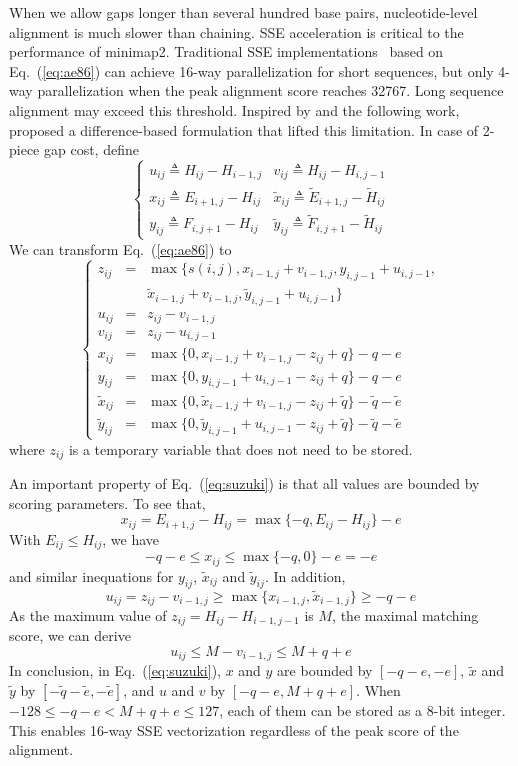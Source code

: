 \documentclass{bioinfo}
\begin{document}
\begin{methods}
When we allow gaps longer than several hundred base pairs, nucleotide-level
alignment is much slower than chaining. SSE acceleration is critical to the
performance of minimap2. Traditional SSE implementations~\citep{Farrar:2007hs}
based on Eq.~(\ref{eq:ae86}) can achieve 16-way parallelization for short
sequences, but only 4-way parallelization when the peak alignment score reaches
32767. Long sequence alignment may exceed this threshold. Inspired by
\citet{Wu:1996aa} and the following work, \citet{Suzuki130633} proposed a
difference-based formulation that lifted this limitation.
In case of 2-piece gap cost, define
\[
\left\{\begin{array}{ll}
u_{ij}\triangleq H_{ij}-H_{i-1,j} & v_{ij}\triangleq H_{ij}-H_{i,j-1} \\
x_{ij}\triangleq E_{i+1,j}-H_{ij} & \tilde{x}_{ij}\triangleq \tilde{E}_{i+1,j}-\tilde{H}_{ij} \\
y_{ij}\triangleq F_{i,j+1}-H_{ij} & \tilde{y}_{ij}\triangleq \tilde{F}_{i,j+1}-\tilde{H}_{ij}
\end{array}\right.
\]
We can transform Eq.~(\ref{eq:ae86}) to
\begin{equation}\label{eq:suzuki}
\left\{\begin{array}{lll}
z_{ij}&=&\max\{s(i,j),x_{i-1,j}+v_{i-1,j},y_{i,j-1}+u_{i,j-1},\\
&&\tilde{x}_{i-1,j}+v_{i-1,j},\tilde{y}_{i,j-1}+u_{i,j-1}\}\\
u_{ij}&=&z_{ij}-v_{i-1,j}\\
v_{ij}&=&z_{ij}-u_{i,j-1}\\
x_{ij}&=&\max\{0,x_{i-1,j}+v_{i-1,j}-z_{ij}+q\}-q-e\\
y_{ij}&=&\max\{0,y_{i,j-1}+u_{i,j-1}-z_{ij}+q\}-q-e\\
\tilde{x}_{ij}&=&\max\{0,\tilde{x}_{i-1,j}+v_{i-1,j}-z_{ij}+\tilde{q}\}-\tilde{q}-\tilde{e}\\
\tilde{y}_{ij}&=&\max\{0,\tilde{y}_{i,j-1}+u_{i,j-1}-z_{ij}+\tilde{q}\}-\tilde{q}-\tilde{e}
\end{array}\right.
\end{equation}
where $z_{ij}$ is a temporary variable that does not need to be stored.

An important property of Eq.~(\ref{eq:suzuki}) is that all values are bounded
by scoring parameters. To see that,
\[
x_{ij}=E_{i+1,j}-H_{ij}=\max\{-q,E_{ij}-H_{ij}\}-e
\]
With $E_{ij}\le H_{ij}$, we have
\[
-q-e\le x_{ij}\le\max\{-q,0\}-e=-e
\]
and similar inequations for $y_{ij}$, $\tilde{x}_{ij}$ and $\tilde{y}_{ij}$.
In addition,
\[
u_{ij}=z_{ij}-v_{i-1,j}\ge\max\{x_{i-1,j},\tilde{x}_{i-1,j}\}\ge-q-e
\]
As the maximum value of $z_{ij}=H_{ij}-H_{i-1,j-1}$ is $M$, the maximal
matching score, we can derive
\[
u_{ij}\le M-v_{i-1,j}\le M+q+e
\]
In conclusion, in Eq.~(\ref{eq:suzuki}), $x$ and $y$ are bounded by $[-q-e,-e]$,
$\tilde{x}$ and $\tilde{y}$ by $[-\tilde{q}-\tilde{e},-\tilde{e}]$, and $u$ and
$v$ by $[-q-e,M+q+e]$. When $-128\le-q-e<M+q+e\le127$, each of them can be stored as
a 8-bit integer. This enables 16-way SSE vectorization regardless of the peak
score of the alignment.


\end{methods}
\end{document}
